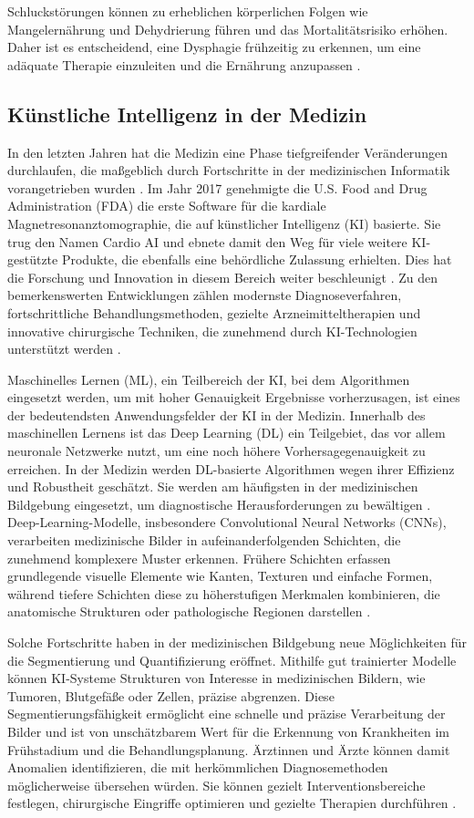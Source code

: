 \documentclass[
	german,
	accentcolor=10c,%
	type=intern,
	marginpar=false
	]{tudapub}
\begin{document}
Schluckstörungen können zu erheblichen körperlichen Folgen wie Mangelernährung und Dehydrierung führen und das Mortalitätsrisiko erhöhen. Daher ist es entscheidend, eine Dysphagie frühzeitig zu erkennen, um eine adäquate Therapie einzuleiten und die Ernährung anzupassen \cite{ref6}.

\subsection{Künstliche Intelligenz in der Medizin}

In den letzten Jahren hat die Medizin eine Phase tiefgreifender Veränderungen durchlaufen, die maßgeblich durch Fortschritte in der medizinischen Informatik vorangetrieben wurden \cite{ref9}. Im Jahr 2017 genehmigte die U.S. Food and Drug Administration (FDA) die erste Software für die kardiale Magnetresonanztomographie, die auf künstlicher Intelligenz (KI) basierte. Sie trug den Namen Cardio AI und ebnete damit den Weg für viele weitere KI-gestützte Produkte, die ebenfalls eine behördliche Zulassung erhielten. Dies hat die Forschung und Innovation in diesem Bereich weiter beschleunigt \cite{ref11}. Zu den bemerkenswerten Entwicklungen zählen modernste Diagnoseverfahren, fortschrittliche Behandlungsmethoden, gezielte Arzneimitteltherapien und innovative chirurgische Techniken, die zunehmend durch KI-Technologien unterstützt werden \cite{ref9}.

Maschinelles Lernen (ML), ein Teilbereich der KI, bei dem Algorithmen eingesetzt werden, um mit hoher Genauigkeit Ergebnisse vorherzusagen, ist eines der bedeutendsten Anwendungsfelder der KI in der Medizin. Innerhalb des maschinellen Lernens ist das Deep Learning (DL) ein Teilgebiet, das vor allem neuronale Netzwerke nutzt, um eine noch höhere Vorhersagegenauigkeit zu erreichen. In der Medizin werden DL-basierte Algorithmen wegen ihrer Effizienz und Robustheit geschätzt. Sie werden am häufigsten in der medizinischen Bildgebung eingesetzt, um diagnostische Herausforderungen zu bewältigen \cite{ref9}. Deep-Learning-Modelle, insbesondere Convolutional Neural Networks (CNNs), verarbeiten medizinische Bilder in aufeinanderfolgenden Schichten, die zunehmend komplexere Muster erkennen. Frühere Schichten erfassen grundlegende visuelle Elemente wie Kanten, Texturen und einfache Formen, während tiefere Schichten diese zu höherstufigen Merkmalen kombinieren, die anatomische Strukturen oder pathologische Regionen darstellen \cite{ref11}.

Solche Fortschritte haben in der medizinischen Bildgebung neue Möglichkeiten für die Segmentierung und Quantifizierung eröffnet. Mithilfe gut trainierter Modelle können KI-Systeme Strukturen von Interesse in medizinischen Bildern, wie Tumoren, Blutgefäße oder Zellen, präzise abgrenzen. Diese Segmentierungsfähigkeit ermöglicht eine schnelle und präzise Verarbeitung der Bilder und ist von unschätzbarem Wert für die Erkennung von Krankheiten im Frühstadium und die Behandlungsplanung. Ärztinnen und Ärzte können damit Anomalien identifizieren, die mit herkömmlichen Diagnosemethoden möglicherweise übersehen würden. Sie können gezielt Interventionsbereiche festlegen, chirurgische Eingriffe optimieren und gezielte Therapien durchführen \cite{ref9,ref11}.
\end{document}

